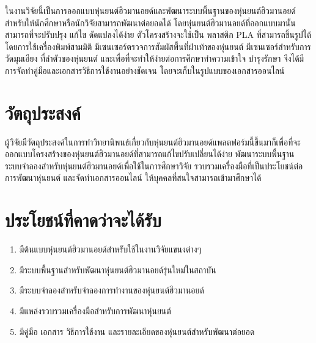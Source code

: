 ในงานวิจัยนี้เป็นการออกแบบหุ่นยนต์ฮิวมานอยด์และพัฒนาระบบพื้นฐานของหุ่นยนต์ฮิวมานอยด์
สำหรับให้นักศึกษาหรือนักวิจัยสามารถพัฒนาต่อยอดได้ โดยหุ่นยนต์ฮิวมานอยด์ที่ออกแบบมานั้น 
สามารถที่จะปรับปรุง แก้ไข ดัดแปลงได้ง่าย ตัวโครงสร้างจะใช้เป็น พลาสติก PLA ที่สามารถขึ้นรูปได้
โดยการใช้เครื่องพิมพ์สามมิติ มีเซนเซอร์ตรวจการสัมผัสพื้นที่ฝ่าเท้าของหุ่นยนต์ มีเซนเซอร์สำหรับการวัดมุมเอียง
ที่ลำตัวของหุ่นยนต์ และเพื่อที่จะทำให้ง่ายต่อการศึกษาทำความเข้าใจ บำรุงรักษา 
จึงได้มีการจัดทำคู่มือและเอกสารวิธีการใช้งานอย่างชัดเจน โดยจะเก็บในรูปแบบของเอกสารออนไลน์


\clearpage
\section{วัตถุประสงค์}
ผู้วิจัยมีวัตถุประสงค์ในการทำวิทยานิพนธ์เกี่ยวกับหุ่นยนต์ฮิวมานอยด์แพลตฟอร์มนี้ขึ้นมาก็เพื่อที่จะ
ออกแบบโครงสร้างของหุ่นยนต์ฮิวมานอยด์ที่สามารถแก้ไขปรับเปลี่ยนได้ง่าย พัฒนาระบบพื้นฐาน
ระบบจำลองสำหรับหุ่นยนต์ฮิวมานอยด์เพื่อใช้ในการศึกษาวิจัย รวบรวมเครื่องมือที่เป็นประโยชน์ต่อการพัฒนาหุ่นยนต์
และจัดทำเอกสารออนไลน์ ให้บุคคลที่สนใจสามารถเข้ามาศึกษาได้

\section{ประโยชน์ที่คาดว่าจะได้รับ}
\begin{enumerate}[label=\arabic*, leftmargin=1.5cm]
	\setlength\itemsep{-0.25em}
	\item มีต้นแบบหุ่นยนต์ฮิวมานอยด์สำหรับใช้ในงานวิจัยแขนงต่างๆ
	\item มีระบบพื้นฐานสำหรับพัฒนาหุ่นยนต์ฮิวมานอยด์รุ่นใหม่ในสถาบัน
	\item มีระบบจำลองสำหรับจำลองการทำงานของหุ่นยนต์ฮิวมานอยด์
	\item มีแหล่งรวบรวมเครื่องมือสำหรับการพัฒนาหุ่นยนต์
	\item มีคู่มือ เอกสาร วิธีการใช้งาน และรายละเอียดของหุ่นยนต์สำหรับพัฒนาต่อยอด
\end{enumerate}

